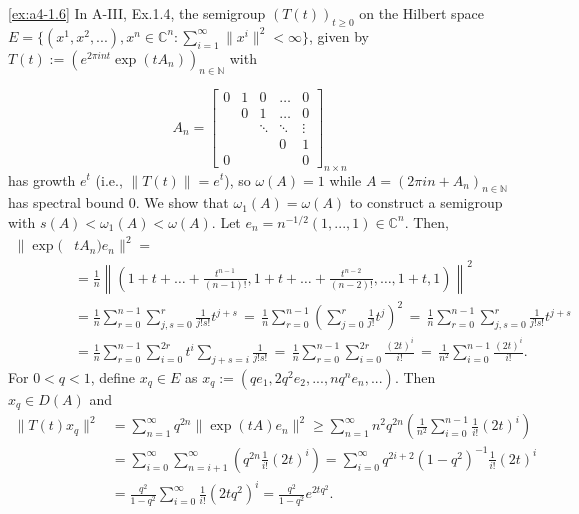 \begin{example} \ref{ex:a4-1.6} In A-III, Ex.1.4, the semigroup \( (T(t))_{t \geq 0} \) on the Hilbert space \( E = \{(x^1, x^2, ...), x^n \in \mathbb{C}^n : \sum_{i=1}^{\infty} \|x^i\|^2 < \infty\} \), given by \( T(t) := (e^{2\pi i n t} \exp(t A_n))_{n \in \mathbb{N}} \) with  

\[
A_n =
\begin{bmatrix}
0 & 1 & 0 & \dots & 0 \\
& 0 & 1 & \dots & 0 \\
& & \ddots & \ddots & \vdots \\
& & & 0 & 1 \\
0 & & & & 0
\end{bmatrix}_{n \times n}
\]
has growth \( e^t \) (i.e., \( \|T(t)\| = e^t \)), so \( \omega(A) = 1 \) while \( A = (2\pi i n + A_n)_{n \in \mathbb{N}} \) has spectral bound \( 0 \). 
We show that \( \omega_1(A) = \omega(A) \) to construct a semigroup with \( s(A) < \omega_1(A) < \omega(A) \). 
Let \( e_n = n^{-1/2} (1, ..., 1) \in \mathbb{C}^n \). 
Then,  
\begin{align*}
\|\exp(&t A_n) e_n\|^2 = \\
&= \frac{1}{n} \left\| (1 + t + \dots + \frac{t^{n-1}}{(n-1)!}, 1 + t + \dots + \frac{t^{n-2}}{(n-2)!}, \dots, 1+t, 1) \right\|^2 \\
&=
\frac{1}{n} \sum_{r=0}^{n-1} \sum_{j,s=0}^{r} \frac{1}{j!s!} t^{j+s} \, = \,
\frac{1}{n} \sum_{r=0}^{n-1} \left(\sum_{j=0}^{r} \frac{1}{j!} t^j \right)^2 
\, = \, \frac{1}{n} \sum_{r=0}^{n-1} \sum_{j,s=0}^{r} \frac{1}{j!s!} t^{j+s} \\
&= 
\frac{1}{n} \sum_{r=0}^{n-1} \sum_{i=0}^{2r} t^i \sum_{j+s=i} \frac{1}{j!s!} \,
= \, 
\frac{1}{n} \sum_{r=0}^{n-1} \sum_{i=0}^{2r} \frac{(2t)^i}{i!} \,  = \,  \frac{1}{n^2} \sum_{i=0}^{n-1} \frac{(2t)^i}{i!}.
\end{align*}
\noindent For \( 0 < q < 1 \), define \( x_q \in E \) as  
\(
x_q := (q e_1, 2q^2 e_2, ..., n q^n e_n, ...).
\)
Then $x_q \in D(A)$ and
\begin{align*}
\|T(t)x_q\|^2 & = \sum_{n=1}^{\infty} q^{2n} \| \exp(t A) e_n \|^2
\geq \sum_{n=1}^{\infty} n^2 q^{2n} \left(\frac{1}{n^2} \sum_{i=0}^{n-1}  \frac{1}{i!} (2t)^i \right)\\
&= \sum_{i=0}^{\infty} \sum_{n=i+1}^{\infty} \left( q^{2n} \frac{1}{i!} (2t)^i \right)
= \sum_{i=0}^{\infty} q^{2i+2} (1 - q^2)^{-1} \frac{1}{i!} (2t)^i \\
&= \frac{q^2}{1 - q^2} \sum_{i=0}^{\infty} \frac{1}{i!} (2t q^2)^i
= \frac{q^2}{1 - q^2} e^{2t q^2}.
\end{align*}


\end{example}
